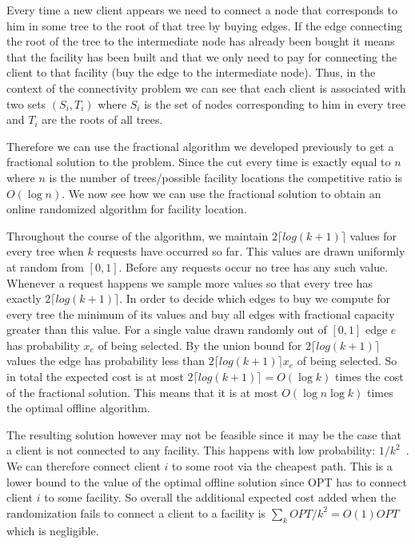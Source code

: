 Every time a new client appears we need to connect a node that corresponds to him in some tree to the root of that tree by buying edges. If the edge connecting the root of the tree to the intermediate node has already been bought it means that the facility has been built and that we only need to pay for connecting the client to that facility (buy the edge to the intermediate node). Thus, in the context of the connectivity problem we can see that each client is associated with two sets $(S_i,T_i)$ where $S_i$ is the set of nodes corresponding to him in every tree and $T_i$ are the roots of all trees.

Therefore we can use the fractional algorithm we developed previously to get a fractional solution to the problem. Since the cut every time is exactly equal to $n$ where $n$ is the number of trees/possible facility locations the competitive ratio is $O(\log n)$. We now see how we can use the fractional solution to obtain an online randomized algorithm for facility location.

Throughout the course of the algorithm, we maintain $2 \lceil log(k+1) \rceil$ values for every tree when $k$ requests have occurred so far. This values are drawn uniformly at random from $[0,1]$. Before any requests occur no tree has any such value. Whenever a request happens we sample more values so that every tree has exactly $2 \lceil log(k+1) \rceil$. In order to decide which edges to buy we compute for every tree the minimum of its values and buy all edges with fractional capacity greater than this value. For a single value drawn randomly out of $[0,1]$ edge $e$ has probability $x_e$ of being selected. By the union bound for $2 \lceil log(k+1) \rceil$ values the edge has probability less than $2 \lceil log(k+1) \rceil x_e$ of being selected. So in total the expected cost is at most $2 \lceil log(k+1) \rceil = O(\log k)$ times the cost of the fractional solution. This means that it is at most $O(\log n \log k)$ times the optimal offline algorithm.

The resulting solution however may not be feasible since it may be the case that a client is not connected to any facility.
This happens with low probability: $1/k^{2}$~\cite{naor11:node-weighted-steiner-tree}.
We can therefore connect client $i$ to some root via the cheapest path. This is a lower bound to the value of the optimal offline solution since OPT has to connect client $i$ to some facility. So overall the additional expected cost added when the randomization fails to connect a client to a facility is $\sum_{k} OPT/k^2 = O(1) OPT$ which is negligible.

